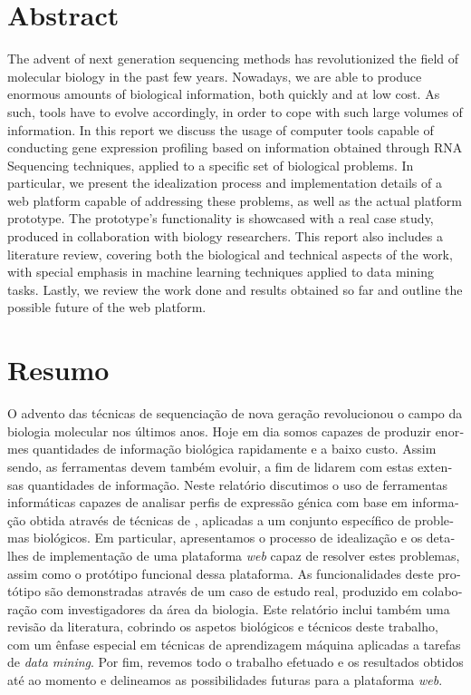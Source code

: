 \chapter*{Abstract}


The advent of next generation sequencing methods has revolutionized the field of
molecular biology in the past few years. Nowadays, we are able to produce
enormous amounts of biological information, both quickly and at low cost. As
such, tools have to evolve accordingly, in order to cope with such large volumes
of information. In this report we discuss the usage of computer tools capable of
conducting gene expression profiling based on information obtained through RNA
Sequencing techniques, applied to a specific set of biological problems. In
particular, we present the idealization process and implementation details of a
web platform capable of addressing these problems, as well as the actual
platform prototype. The prototype's functionality is showcased with a real case
study, produced in collaboration with biology researchers. This report also
includes a literature review, covering both the biological and technical aspects
of the work, with special emphasis in machine learning techniques applied to
data mining tasks. Lastly, we review the work done and results obtained so far
and outline the possible future of the web platform.

\chapter*{Resumo}

\begin{otherlanguage}{portuguese}
O advento das técnicas de sequenciação de nova geração revolucionou o campo da
biologia molecular nos últimos anos. Hoje em dia somos capazes de produzir
enormes quantidades de informação biológica rapidamente e a baixo custo. Assim
sendo, as ferramentas devem também evoluir, a fim de lidarem com estas extensas
quantidades de informação. Neste relatório discutimos o uso de ferramentas
informáticas capazes de analisar perfis de expressão génica com base em
informação obtida através de técnicas de \textit{\rnaseq{}}, aplicadas a um
conjunto específico de problemas biológicos. Em particular, apresentamos o
processo de idealização e os detalhes de implementação de uma plataforma
\textit{web} capaz de resolver estes problemas, assim como o protótipo funcional
dessa plataforma. As funcionalidades deste protótipo são demonstradas através de
um caso de estudo real, produzido em colaboração com investigadores da área da
biologia. Este relatório inclui também uma revisão da literatura, cobrindo os
aspetos biológicos e técnicos deste trabalho, com um ênfase especial em técnicas
de aprendizagem máquina aplicadas a tarefas de \textit{data mining}. Por fim,
revemos todo o trabalho efetuado e os resultados obtidos até ao momento e
delineamos as possibilidades futuras para a plataforma \textit{web}.
\end{otherlanguage}
